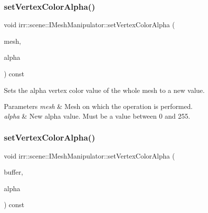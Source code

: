\subsubsection{\texorpdfstring{set\+Vertex\+Color\+Alpha()}{setVertexColorAlpha()}\hspace{0.1cm}{\footnotesize\ttfamily [1/2]}}
{\footnotesize\ttfamily void irr\+::scene\+::\+I\+Mesh\+Manipulator\+::set\+Vertex\+Color\+Alpha (\begin{DoxyParamCaption}\item[{\hyperlink{classirr_1_1scene_1_1IMesh}{I\+Mesh} $\ast$}]{mesh,  }\item[{\hyperlink{namespaceirr_ac66849b7a6ed16e30ebede579f9b47c6}{s32}}]{alpha }\end{DoxyParamCaption}) const\hspace{0.3cm}{\ttfamily [inline]}}



Sets the alpha vertex color value of the whole mesh to a new value. 


\begin{DoxyParams}{Parameters}
{\em mesh} & Mesh on which the operation is performed. \\
\hline
{\em alpha} & New alpha value. Must be a value between 0 and 255. \\
\hline
\end{DoxyParams}
\mbox{\label{classirr_1_1scene_1_1IMeshManipulator_af69cbfcfd9286ccec2c6088a09dbe4a3}} 
\subsubsection{\texorpdfstring{set\+Vertex\+Color\+Alpha()}{setVertexColorAlpha()}\hspace{0.1cm}{\footnotesize\ttfamily [2/2]}}
{\footnotesize\ttfamily void irr\+::scene\+::\+I\+Mesh\+Manipulator\+::set\+Vertex\+Color\+Alpha (\begin{DoxyParamCaption}\item[{\hyperlink{classirr_1_1scene_1_1IMeshBuffer}{I\+Mesh\+Buffer} $\ast$}]{buffer,  }\item[{\hyperlink{namespaceirr_ac66849b7a6ed16e30ebede579f9b47c6}{s32}}]{alpha }\end{DoxyParamCaption}) const\hspace{0.3cm}{\ttfamily [inline]}}



